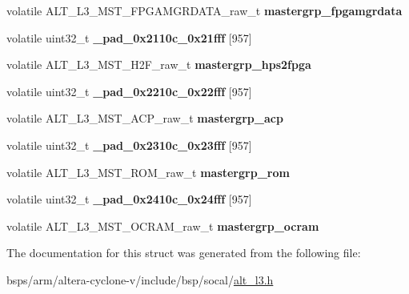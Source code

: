 \begin{DoxyCompactItemize}
\mbox{\label{structALT__L3__MSTGRP__raw__s_ae99a33d742a8dfc94b73e96e26ae61b1}} 
volatile A\+L\+T\+\_\+\+L3\+\_\+\+M\+S\+T\+\_\+\+F\+P\+G\+A\+M\+G\+R\+D\+A\+T\+A\+\_\+raw\+\_\+t {\bfseries mastergrp\+\_\+fpgamgrdata}
\item 
\mbox{\label{structALT__L3__MSTGRP__raw__s_a2f09e0235f2f719abc831204987dc3d9}} 
volatile uint32\+\_\+t {\bfseries \+\_\+pad\+\_\+0x2110c\+\_\+0x21fff} \mbox{[}957\mbox{]}
\item 
\mbox{\label{structALT__L3__MSTGRP__raw__s_a488abec57e22b2ac0eb4349354d0baea}} 
volatile A\+L\+T\+\_\+\+L3\+\_\+\+M\+S\+T\+\_\+\+H2\+F\+\_\+raw\+\_\+t {\bfseries mastergrp\+\_\+hps2fpga}
\item 
\mbox{\label{structALT__L3__MSTGRP__raw__s_af160b3d0eeadfe42b13a67d730c6b675}} 
volatile uint32\+\_\+t {\bfseries \+\_\+pad\+\_\+0x2210c\+\_\+0x22fff} \mbox{[}957\mbox{]}
\item 
\mbox{\label{structALT__L3__MSTGRP__raw__s_a58a00bc3982c562f27664f183fd65578}} 
volatile A\+L\+T\+\_\+\+L3\+\_\+\+M\+S\+T\+\_\+\+A\+C\+P\+\_\+raw\+\_\+t {\bfseries mastergrp\+\_\+acp}
\item 
\mbox{\label{structALT__L3__MSTGRP__raw__s_ae84362c29cfd592e7fd0fea15cbaf13a}} 
volatile uint32\+\_\+t {\bfseries \+\_\+pad\+\_\+0x2310c\+\_\+0x23fff} \mbox{[}957\mbox{]}
\item 
\mbox{\label{structALT__L3__MSTGRP__raw__s_a4196e397b6a1b43609574a9dd1767355}} 
volatile A\+L\+T\+\_\+\+L3\+\_\+\+M\+S\+T\+\_\+\+R\+O\+M\+\_\+raw\+\_\+t {\bfseries mastergrp\+\_\+rom}
\item 
\mbox{\label{structALT__L3__MSTGRP__raw__s_a175da291c7c12ac298fa5aabd5579293}} 
volatile uint32\+\_\+t {\bfseries \+\_\+pad\+\_\+0x2410c\+\_\+0x24fff} \mbox{[}957\mbox{]}
\item 
\mbox{\label{structALT__L3__MSTGRP__raw__s_a062eb7000cc2fefe3567542094daabbd}} 
volatile A\+L\+T\+\_\+\+L3\+\_\+\+M\+S\+T\+\_\+\+O\+C\+R\+A\+M\+\_\+raw\+\_\+t {\bfseries mastergrp\+\_\+ocram}
\end{DoxyCompactItemize}


The documentation for this struct was generated from the following file\+:\begin{DoxyCompactItemize}
\item 
bsps/arm/altera-\/cyclone-\/v/include/bsp/socal/\mbox{\hyperlink{alt__l3_8h}{alt\+\_\+l3.\+h}}\end{DoxyCompactItemize}
